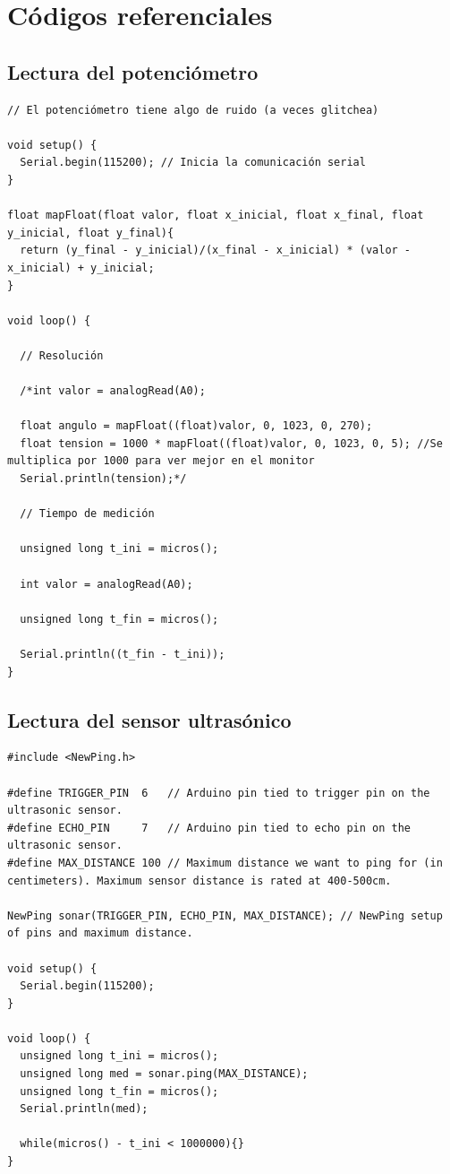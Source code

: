 \documentclass[a4paper,12pt]{article}
\begin{document}
\section{Códigos referenciales}

\subsection{Lectura del potenciómetro}
\label{código pote}

\begin{verbatim}
// El potenciómetro tiene algo de ruido (a veces glitchea)

void setup() {
  Serial.begin(115200); // Inicia la comunicación serial
}

float mapFloat(float valor, float x_inicial, float x_final, float y_inicial, float y_final){
  return (y_final - y_inicial)/(x_final - x_inicial) * (valor - x_inicial) + y_inicial;
}

void loop() {

  // Resolución

  /*int valor = analogRead(A0);

  float angulo = mapFloat((float)valor, 0, 1023, 0, 270); 
  float tension = 1000 * mapFloat((float)valor, 0, 1023, 0, 5); //Se multiplica por 1000 para ver mejor en el monitor
  Serial.println(tension);*/

  // Tiempo de medición

  unsigned long t_ini = micros();

  int valor = analogRead(A0);

  unsigned long t_fin = micros();

  Serial.println((t_fin - t_ini));
}
\end{verbatim}

\subsection{Lectura del sensor ultrasónico}
\label{código sensor}

\begin{verbatim}
#include <NewPing.h>

#define TRIGGER_PIN  6   // Arduino pin tied to trigger pin on the ultrasonic sensor.
#define ECHO_PIN     7   // Arduino pin tied to echo pin on the ultrasonic sensor.
#define MAX_DISTANCE 100 // Maximum distance we want to ping for (in centimeters). Maximum sensor distance is rated at 400-500cm.

NewPing sonar(TRIGGER_PIN, ECHO_PIN, MAX_DISTANCE); // NewPing setup of pins and maximum distance.

void setup() {
  Serial.begin(115200);
}

void loop() {
  unsigned long t_ini = micros();
  unsigned long med = sonar.ping(MAX_DISTANCE);
  unsigned long t_fin = micros();
  Serial.println(med);

  while(micros() - t_ini < 1000000){}
}
\end{verbatim}
\end{document}
